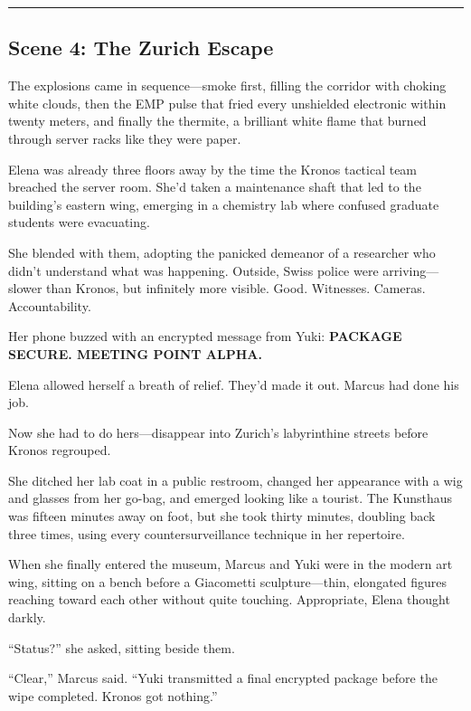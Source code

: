 \begin{center}\rule{0.5\linewidth}{0.5pt}\end{center}

\hypertarget{scene-4-the-zurich-escape}{%
\subsection{Scene 4: The Zurich Escape}\label{scene-4-the-zurich-escape}}

The explosions came in sequence---smoke first, filling the corridor with choking white clouds, then the EMP pulse that fried every unshielded electronic within twenty meters, and finally the thermite, a brilliant white flame that burned through server racks like they were paper.

Elena was already three floors away by the time the Kronos tactical team breached the server room. She'd taken a maintenance shaft that led to the building's eastern wing, emerging in a chemistry lab where confused graduate students were evacuating.

She blended with them, adopting the panicked demeanor of a researcher who didn't understand what was happening. Outside, Swiss police were arriving---slower than Kronos, but infinitely more visible. Good. Witnesses. Cameras. Accountability.

Her phone buzzed with an encrypted message from Yuki: \textbf{PACKAGE SECURE. MEETING POINT ALPHA.}

Elena allowed herself a breath of relief. They'd made it out. Marcus had done his job.

Now she had to do hers---disappear into Zurich's labyrinthine streets before Kronos regrouped.

She ditched her lab coat in a public restroom, changed her appearance with a wig and glasses from her go-bag, and emerged looking like a tourist. The Kunsthaus was fifteen minutes away on foot, but she took thirty minutes, doubling back three times, using every countersurveillance technique in her repertoire.

When she finally entered the museum, Marcus and Yuki were in the modern art wing, sitting on a bench before a Giacometti sculpture---thin, elongated figures reaching toward each other without quite touching. Appropriate, Elena thought darkly.

``Status?'' she asked, sitting beside them.

``Clear,'' Marcus said. ``Yuki transmitted a final encrypted package before the wipe completed. Kronos got nothing.''

